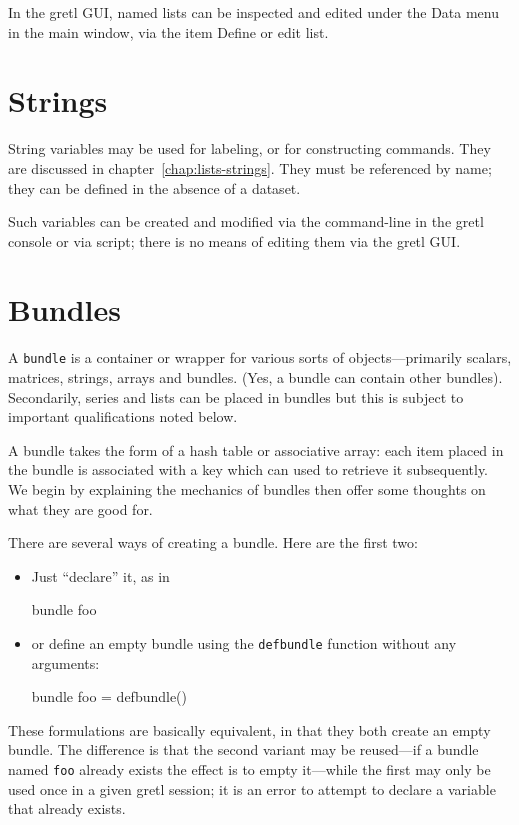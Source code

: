 In the gretl GUI, named lists can be inspected and edited under the
\textsf{Data} menu in the main window, via the item \textsf{Define or
  edit list}.

\section{Strings}
\label{sec:Strings}

String variables may be used for labeling, or for constructing
commands. They are discussed in chapter~\ref{chap:lists-strings}. They
must be referenced by name; they can be defined in the absence of a
dataset.

Such variables can be created and modified via the command-line in
the gretl console or via script; there is no means of editing them
via the gretl GUI.

\section{Bundles}
\label{sec:Bundles}

A \texttt{bundle} is a container or wrapper for various sorts of
objects---primarily scalars, matrices, strings, arrays and
bundles. (Yes, a bundle can contain other bundles). Secondarily,
series and lists can be placed in bundles but this is subject to
important qualifications noted below.

A bundle takes the form of a hash table or associative array: each
item placed in the bundle is associated with a key which can used to
retrieve it subsequently. We begin by explaining the mechanics of
bundles then offer some thoughts on what they are good for.

There are several ways of creating a bundle. Here are the first two:
\begin{itemize}
\item Just ``declare'' it, as in
\begin{code}
bundle foo
\end{code}
\item or define an empty bundle using the \texttt{defbundle} function
without any arguments:
\begin{code}
bundle foo = defbundle()
\end{code}
\end{itemize}
These formulations are basically equivalent, in that they both
create an empty bundle. The difference is that the second variant may
be reused---if a bundle named \texttt{foo} already exists the effect
is to empty it---while the first may only be used once in a given
gretl session; it is an error to attempt to declare a variable that
already exists.

